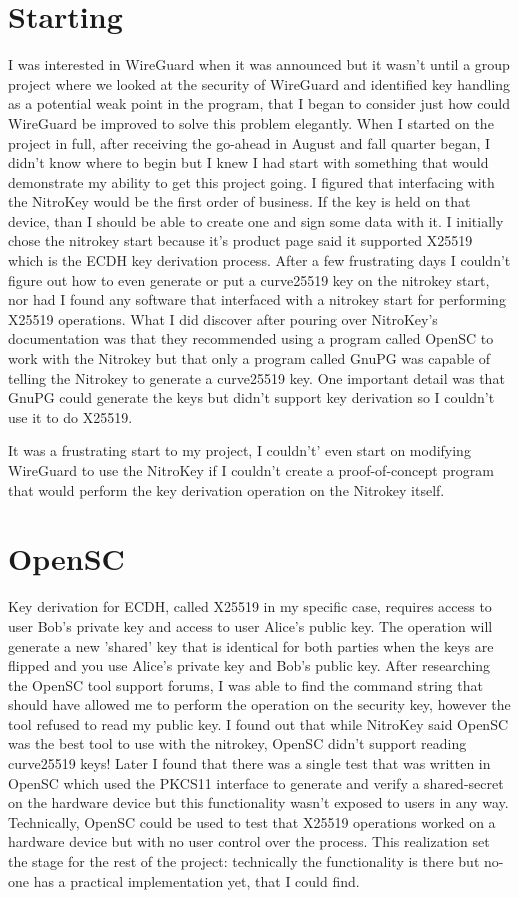 \documentclass [11pt, proquest] {uwthesis}[2020/02/24]
\begin{document}
\section {Starting}
I was interested in WireGuard when it was announced but it wasn't until a group project where we looked at the security of WireGuard and identified key handling as a potential weak point in the program, that I began to consider just how could WireGuard be improved to solve this problem elegantly. 
When I started on the project in full, after receiving the go-ahead in August and fall quarter began, I didn't know where to begin but I knew I had start with something that would demonstrate my ability to get this project going.
I figured that interfacing with the NitroKey would be the first order of business. If the key is held on that device, than I should be able to create one and sign some data with it. I initially chose the nitrokey start because it's product page said it supported X25519\cite{noauthor_nitrokey_nodate} which is the ECDH key derivation process. After a few frustrating days I couldn't figure out how to even generate or put a curve25519 key on the nitrokey start, nor had I found any software that interfaced with a nitrokey start for performing X25519 operations. What I did discover after pouring over NitroKey's documentation was that they recommended using a program called OpenSC to work with the Nitrokey but that only a program called GnuPG was capable of telling the Nitrokey to generate a curve25519 key. One important detail was that GnuPG could generate the keys but didn't support key derivation so I couldn't use it to do X25519.

It was a frustrating start to my project, I couldn't' even start on modifying WireGuard to use the NitroKey if I couldn't create a proof-of-concept program that would perform the key derivation operation on the Nitrokey itself.
\section {OpenSC}
Key derivation for ECDH, called X25519 in my specific case, requires access to user Bob's private key and access to user Alice's public key. The operation will generate a new 'shared' key that is identical for both parties when the keys are flipped and you use Alice's private key and Bob's public key.
After researching the OpenSC tool support forums, I was able to find the command string that should have allowed me to perform the operation on the security key, however the tool refused to read my public key. I found out that while NitroKey said OpenSC was the best tool to use with the nitrokey, OpenSC didn't support reading curve25519 keys! Later I found that there was a single test that was written in OpenSC which used the PKCS11 interface to generate and verify a shared-secret on the hardware device but this functionality wasn't exposed to users in any way. Technically, OpenSC could be used to test that X25519 operations worked on a hardware device but with no user control over the process. This realization set the stage for the rest of the project: technically the functionality is there but no-one has a practical implementation yet, that I could find.
\end{document}
